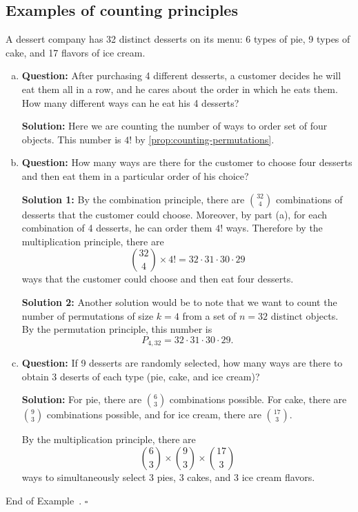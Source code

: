 \documentclass[10pt]{article}
\theoremstyle{definition}
\newtheorem{example}[theorem]{Example}
\renewenvironment{example}
{\begin{oldexample}}
  {\par\smallskip\hfill   End of Example~\theexample. $\square$    \par\end{oldexample}}
\newcommand{\fl}{\noindent\textbf} %
\newcommand{\1}[1]{\textbf{1}_{\left[#1\right]}} %
\begin{document}
\subsection{Examples of counting principles}
\begin{example}
  A dessert company has 32 distinct desserts on its menu: 6 types of pie, 9
  types of cake, and 17 flavors of ice cream.
  \begin{enumerate}[(a)]
    \item \textbf{Question:} After purchasing 4 different desserts, a customer decides he will
    eat them all in a row, and he cares about the order in which he eats them.
    How many different ways can he eat his 4 desserts?

    \textbf{Solution:} Here we are counting the number of ways to order
    set of four objects. This number is $4!$ by
    \cref{prop:counting-permutations}.
    
    \item \textbf{Question:} How many ways are there for the customer to choose
    four desserts and then eat them in a particular order of his choice?

    \textbf{Solution 1:} By the combination principle, there are ${32\choose 4}$
    combinations of desserts that the customer could choose. Moreover, by part
    (a), for each combination of 4 desserts, he can order them $4!$ ways.
    Therefore by the multiplication principle, there are
    \begin{equation*}
      {32\choose 4} \times 4! = 32\cdot 31\cdot 30\cdot 29
    \end{equation*}
    ways that the customer could choose and then eat four desserts.

    \textbf{Solution 2:} Another solution would be to note that we want to
    count the number of permutations of size $k=4$ from a set of $n=32$
    distinct objects. By the permutation principle, this
    number is
    \begin{equation*}
      P_{4,32} = 32\cdot 31\cdot30 \cdot29.
    \end{equation*}
    
    \item \textbf{Question:} If 9 desserts are randomly selected, how many ways
    are there to obtain 3 deserts of each type (pie, cake, and ice cream)?

    \fl{Solution:} For pie, there are ${6\choose 3}$ combinations possible.
    For cake, there are ${9\choose 3}$ combinations possible, and for ice
    cream, there are ${17\choose 3}$.

    By the multiplication principle, there are
    \begin{equation*}
      {6\choose 3}\times {9\choose 3}\times {17\choose 3}
    \end{equation*}
    ways to simultaneously select 3 pies, 3 cakes, and 3 ice cream flavors.
  \end{enumerate}
\end{example}
\end{document}
